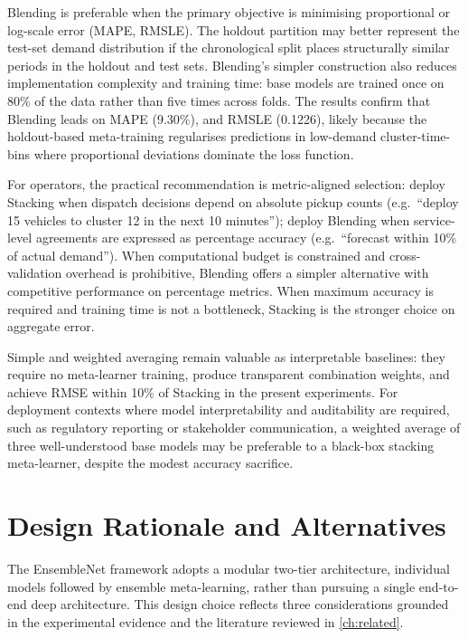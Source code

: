 Blending is preferable when the primary objective is minimising proportional or log-scale error (MAPE, RMSLE). The holdout partition may better represent the test-set demand distribution if the chronological split places structurally similar periods in the holdout and test sets. Blending's simpler construction also reduces implementation complexity and training time: base models are trained once on 80\% of the data rather than five times across folds. The results confirm that Blending leads on MAPE (9.30\%), and RMSLE (0.1226), likely because the holdout-based meta-training regularises predictions in low-demand cluster-time-bins where proportional deviations dominate the loss function.

For operators, the practical recommendation is metric-aligned selection: deploy Stacking when dispatch decisions depend on absolute pickup counts (e.g.\ ``deploy 15 vehicles to cluster 12 in the next 10 minutes''); deploy Blending when service-level agreements are expressed as percentage accuracy (e.g.\ ``forecast within 10\% of actual demand''). When computational budget is constrained and cross-validation overhead is prohibitive, Blending offers a simpler alternative with competitive performance on percentage metrics. When maximum accuracy is required and training time is not a bottleneck, Stacking is the stronger choice on aggregate error.

Simple and weighted averaging remain valuable as interpretable baselines: they require no meta-learner training, produce transparent combination weights, and achieve RMSE within 10\% of Stacking in the present experiments. For deployment contexts where model interpretability and auditability are required, such as regulatory reporting or stakeholder communication, a weighted average of three well-understood base models may be preferable to a black-box stacking meta-learner, despite the modest accuracy sacrifice.

\section{Design Rationale and Alternatives}
\label{sec:framework-rationale}

The EnsembleNet framework adopts a modular two-tier architecture, individual models followed by ensemble meta-learning, rather than pursuing a single end-to-end deep architecture. This design choice reflects three considerations grounded in the experimental evidence and the literature reviewed in \autoref{ch:related}.

